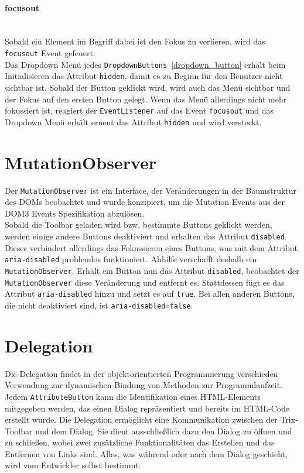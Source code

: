 \paragraph{focusout}\mbox{}\\
Sobald ein Element im Begriff dabei ist den Fokus zu verlieren, wird das \texttt{focusout} Event gefeuert.\\
Das Dropdown Menü jedes \texttt{DropdownButtons}~\ref{dropdown_button} erhält beim Initialisieren das Attribut \texttt{hidden}, damit es zu Beginn für den Benutzer nicht sichtbar ist. Sobald der Button geklickt wird, wird auch das Menü sichtbar und der Fokus auf den ersten Button gelegt. Wenn das Menü allerdings nicht mehr fokussiert ist, reagiert der \texttt{EventListener} auf das Event \texttt{focusout} und das Dropdown Menü erhält erneut das Attribut \texttt{hidden} und wird versteckt.

\section{MutationObserver}
Der \texttt{MutationObserver} ist ein Interface, der Veränderungen in der Baumstruktur des DOMs beobachtet und wurde konzipiert, um die Mutation Events aus der DOM3 Events Spezifikation abzulösen.\\
Sobald die Toolbar geladen wird bzw. bestimmte Buttons geklickt werden, werden einige andere Buttons deaktiviert und erhalten das Attribut \texttt{disabled}. Dieses verhindert allerdings das Fokussieren eines Buttons, was mit dem Attribut \texttt{aria-disabled} problemlos funktioniert. Abhilfe verschafft deshalb ein \texttt{MutationObserver}. Erhält ein Button nun das Attribut \texttt{disabled}, beobachtet der \texttt{MutationObserver} diese Veränderung und entfernt es. Stattdessen fügt es das Attribut \texttt{aria-disabled} hinzu und setzt es auf \texttt{true}. Bei allen anderen Buttons, die nicht deaktiviert sind, ist \texttt{aria-disabled=false}.

\section{Delegation}
Die Delegation findet in der objektorientierten Programmierung verschieden Verwendung zur dynamischen Bindung von Methoden zur Programmlaufzeit.\\
Jedem \texttt{AttributeButton} kann die Identifikation eines HTML-Elements mitgegeben werden, das einen Dialog repräsentiert und bereits im HTML-Code erstellt wurde. Die Delegation ermöglicht eine Kommunikation zwischen der Trix-Toolbar und dem Dialog. Sie dient ausschließlich dazu den Dialog zu öffnen und zu schließen, wobei zwei zusätzliche Funktionalitäten das Erstellen und das Entfernen von Links sind. Alles, was während oder nach dem Dialog geschieht, wird vom Entwickler selbst bestimmt.

